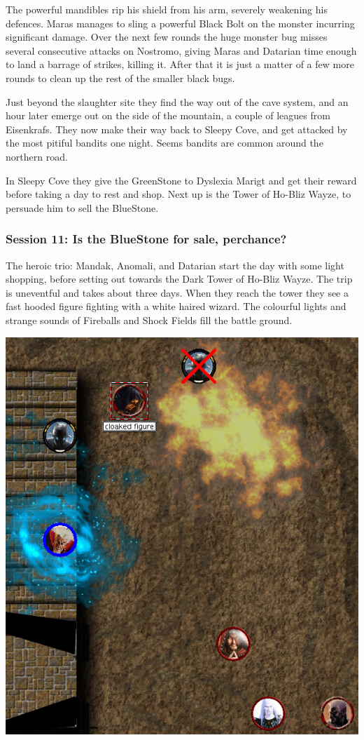 The powerful mandibles rip his shield from his arm, severely weakening his defences. Maras manages to sling a powerful Black Bolt on the monster incurring significant damage. Over the next few rounds the huge monster bug misses several consecutive attacks on Nostromo, giving Maras and Datarian time enough to land a barrage of strikes, killing it. After that it is just a matter of a few more rounds to clean up the rest of the smaller black bugs.

Just beyond the slaughter site they find the way out of the cave system, and an hour later emerge out on the side of the mountain, a couple of leagues from Eisenkrafs. They now make their way back to Sleepy Cove, and get attacked by the most pitiful bandits one night. Seems bandits are common around the northern road.

In Sleepy Cove they give the GreenStone to Dyslexia Marigt and get their reward before taking a day to rest and shop. Next up is the Tower of Ho-Bliz Wayze, to persuade him to sell the BlueStone.


\subsubsection*{Session 11: Is the BlueStone for sale, perchance?}
The heroic trio: Mandak, Anomali, and Datarian start the day with some light shopping, before setting out towards the Dark Tower of Ho-Bliz Wayze. The trip is uneventful and takes about three days.
When they reach the tower they see a fast hooded figure fighting with a white haired wizard. The colourful lights and strange sounds of Fireballs and Shock Fields fill the battle ground.

\begin{center}
\vspace{0.5 cm}
\includegraphics[width=0.7\linewidth]{./figs/playthrough/tower-fight.png}
\vspace{0.5 cm}
\end{center}

